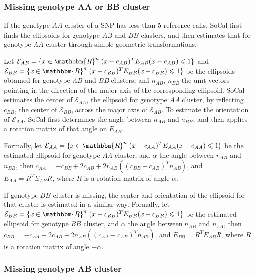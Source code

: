 \documentclass{scrartcl}
\begin{document}
\subsubsection{Missing genotype AA or BB cluster}

\par
If the genotype $AA$ cluster of a SNP has less than 5 reference calls, SoCal
first finds the ellipsoids for genotype $AB$ and $BB$ clusters, and then
estimates that for genotype $AA$ cluster through simple geometric
transformations.

\par
Let $\mathcal{E}_{AB}=
\{x \in \mathbbm{R}^{n}|(x-c_{AB})^TE_{AB}(x-c_{AB}) \leqslant 1\}$
and $\mathcal{E}_{BB}=
\{x \in \mathbbm{R}^{n}|(x-c_{BB})^TE_{BB}(x-c_{BB}) \leqslant 1\}$
be the ellipsoids obtained for genotype $AB$ and $BB$ clusters,
and $n_{AB}$, $n_{BB}$ the unit vectors pointing in the direction of
the major axis of the corresponding ellipsoid.
SoCal estimates the center of $\mathcal{E}_{AA}$, the ellipsoid for genotype
$AA$ cluster, by reflecting $c_{BB}$, the center of $\mathcal{E}_{BB}$, across
the major axis of $\mathcal{E}_{AB}$.
To estimate the orientation of $\mathcal{E}_{AA}$, SoCal first determines the
angle between $n_{AB}$ and $n_{BB}$, and then applies a rotation matrix of
that angle on $E_{AB}$.

\par
Formally, let $\mathcal{E}_{AA}=
\{x \in \mathbbm{R}^{n}|(x-c_{AA})^TE_{AA}(x-c_{AA}) \leqslant 1\}$ be the
estimated ellipsoid for genotype $AA$ cluster, and $\alpha$ the angle between
$n_{AB}$ and $n_{BB}$, then
$c_{AA}=-c_{BB}+2c_{AB}+2n_{AB}((c_{BB}-c_{AB})^{T}n_{AB})$, and
$E_{AA}=R^{T}E_{AB}R$, where $R$ is a rotation matrix of angle $\alpha$.

\par
If genotype $BB$ cluster is missing, the center and orientation of the
ellipsoid for that cluster is estimated in a similar way.
Formally, let $\mathcal{E}_{BB}=
\{x \in \mathbbm{R}^{n}|(x-c_{BB})^TE_{BB}(x-c_{BB}) \leqslant 1\}$ be the
estimated ellipsoid for genotype $BB$ cluster, and $\alpha$ the angle between
$n_{AB}$ and $n_{AA}$, then
$c_{BB}=-c_{AA}+2c_{AB}+2n_{AB}((c_{AA}-c_{AB})^{T}n_{AB})$, and
$E_{BB}=R^{T}E_{AB}R$, where $R$ is a rotation matrix of angle $-\alpha$.

\subsubsection{Missing genotype AB cluster}
\end{document}
